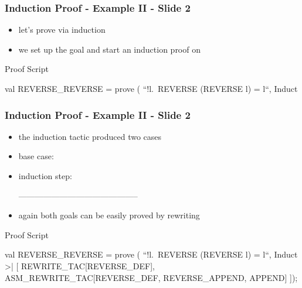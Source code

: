 \begin{frame}[fragile]
\frametitle{Induction Proof - Example II - Slide 2}

\begin{itemize}
\item let's prove via induction\\
\item we set up the goal and start an induction proof on 
\end{itemize}

\begin{block}{Proof Script}
\begin{semiverbatim}\small
val REVERSE_REVERSE = prove (
``!l.\ REVERSE (REVERSE l) = l``,
Induct
\end{semiverbatim}
\end{block}

\end{frame}

\begin{frame}[fragile]
\frametitle{Induction Proof - Example II - Slide 2}

\begin{itemize}
\item the induction tactic produced two cases
\item base case:\\
{\scriptsize{}}
\item induction step:\\
{\scriptsize
\begin{semiverbatim}
--------------------------------------------
\end{semiverbatim}}

\item again both goals can be easily proved by rewriting
\end{itemize}

\begin{block}{Proof Script}
\begin{semiverbatim}\scriptsize
val REVERSE_REVERSE = prove (
``!l.\ REVERSE (REVERSE l) = l``,
Induct >| [
  REWRITE_TAC[REVERSE_DEF],
  ASM_REWRITE_TAC[REVERSE_DEF, REVERSE_APPEND, APPEND]
]);
\end{semiverbatim}
\end{block}

\end{frame}

